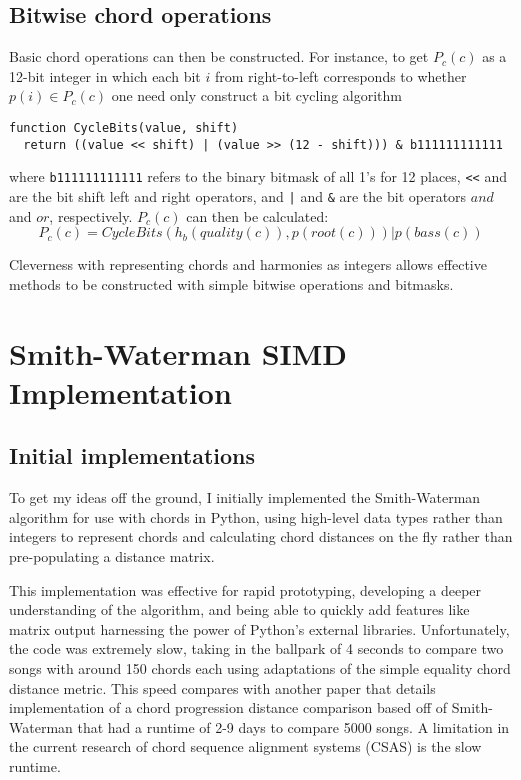 \subsection{Bitwise chord operations}

Basic chord operations can then be constructed. For instance, to get $P_c(c)$ as a 12-bit integer in which each bit $i$ from right-to-left corresponds to whether $p(i) \in P_c(c)$ one need only construct a bit cycling algorithm
\begin{verbatim}
function CycleBits(value, shift)
  return ((value << shift) | (value >> (12 - shift))) & b111111111111
\end{verbatim}
where \texttt{b111111111111} refers to the binary bitmask of all 1's for 12 places, \texttt{<<} and \text{>>} are the bit shift left and right operators, and \texttt{|} and \texttt{&} are the bit operators $and$ and $or$, respectively. $P_c(c)$ can then be calculated: \[ P_c(c) = CycleBits(h_b(quality(c)), p(root(c))) | p(bass(c)) \]

Cleverness with representing chords and harmonies as integers allows effective methods to be constructed with simple bitwise operations and bitmasks.

\section{Smith-Waterman SIMD Implementation}

\subsection{Initial implementations}

To get my ideas off the ground, I initially implemented the Smith-Waterman algorithm for use with chords in Python, using high-level data types rather than integers to represent chords and calculating chord distances on the fly rather than pre-populating a distance matrix.

This implementation was effective for rapid prototyping, developing a deeper understanding of the algorithm, and being able to quickly add features like matrix output harnessing the power of Python's external libraries. Unfortunately, the code was extremely slow, taking in the ballpark of 4 seconds to compare two songs with around 150 chords each using adaptations of the simple equality chord distance metric. This speed compares with another paper that details implementation of a chord progression distance comparison based off of Smith-Waterman that had a runtime of 2-9 days to compare 5000 songs\cite{de2010comparing}. A limitation in the current research of chord sequence alignment systems (CSAS) is the slow runtime.

